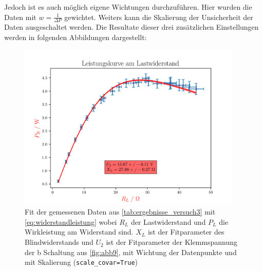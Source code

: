 \documentclass[11pt,ngerman]{scrartcl}
\begin{document}
Jedoch ist es auch möglich eigene Wichtungen durchzuführen. Hier wurden die
Daten mit $w=\frac{1}{\Delta P}$ gewichtet. Weiters kann die Skalierung der
Unsicherheit der Daten ausgeschaltet werden. Die Resultate dieser drei
zusätzlichen Einstellungen werden in folgenden Abbildungen dargestellt:

\begin{figure}[H]
	\begin{center}
		\includegraphics[width=0.95\textwidth]{./bigpics/withweightsandscalecovartrue.png}
	\end{center}
	\caption{Fit der gemessenen Daten aus \autoref{tab:ergebnisse_versuch3} mit
		\autoref{eq:widerstandleistung} wobei $R_L$ der Lastwiderstand und $P_L$ die
		Wirkleistung am Widerstand sind. $X_L$ ist der Fitparameter des
		Blindwiderstands und $U_2$ ist der Fitparameter der Klemmspannung der b Schaltung aus
		\autoref{fig:abb9}, mit Wichtung der Datenpunkte und mit Skalierung (\texttt{scale\_covar=True})}
	\label{fig:fit_mit_wichtung_mit_skalierung}
\end{figure}
\end{document}
